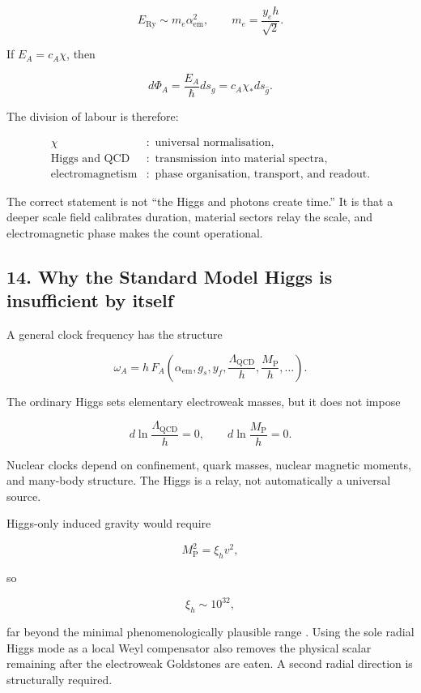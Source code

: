 \documentclass[
]{article}
\begin{document}
\[
E_{\mathrm{Ry}}\sim m_e\alpha_{\mathrm{em}}^2,
\qquad
m_e=\frac{y_eh}{\sqrt2}.
\]

If \(E_A=c_A\chi\), then

\[
d\Phi_A=\frac{E_A}{\hbar}ds_g
=c_A\chi_*ds_{\widehat g}.
\]

The division of labour is therefore:

\[
\boxed{
\begin{aligned}
\chi&:\text{ universal normalisation},\\
\text{Higgs and QCD}&:\text{ transmission into material spectra},\\
\text{electromagnetism}&:\text{ phase organisation, transport, and readout}.
\end{aligned}}
\]

The correct statement is not ``the Higgs and photons create time.'' It
is that a deeper scale field calibrates duration, material sectors relay
the scale, and electromagnetic phase makes the count operational.

\subsection{14. Why the Standard Model Higgs is insufficient by
itself}\label{why-the-standard-model-higgs-is-insufficient-by-itself}

A general clock frequency has the structure

\[
\omega_A
=h\,F_A\left(
\alpha_{\mathrm{em}},g_s,y_f,
\frac{\Lambda_{\mathrm{QCD}}}h,
\frac{M_{\mathrm{P}}}h,\ldots
\right).
\]

The ordinary Higgs sets elementary electroweak masses, but it does not
impose

\[
d\ln\frac{\Lambda_{\mathrm{QCD}}}h=0,
\qquad
d\ln\frac{M_{\mathrm{P}}}h=0.
\]

Nuclear clocks depend on confinement, quark masses, nuclear magnetic
moments, and many-body structure. The Higgs is a relay, not
automatically a universal source.

Higgs-only induced gravity would require

\[
M_{\mathrm{P}}^2=\xi_hv^2,
\]

so

\[
\xi_h\sim10^{32},
\]

far beyond the minimal phenomenologically plausible range
. Using the sole radial Higgs mode as
a local Weyl compensator also removes the physical scalar remaining
after the electroweak Goldstones are eaten. A second radial direction is
structurally required.
\end{document}
